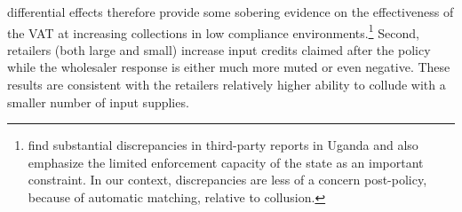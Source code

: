 differential effects therefore provide some sobering evidence on the effectiveness of the VAT at increasing collections in low compliance environments.\footnote{\cite{almunia2017analysis} find substantial discrepancies in third-party reports in Uganda and also emphasize the limited enforcement capacity of the state as an important constraint. In our context, discrepancies are less of a concern post-policy, because of automatic matching, relative to collusion.} Second, retailers (both large and small) increase input credits claimed after the policy while the wholesaler response is either much more muted or even negative. These results are consistent with the retailers relatively higher ability to collude with a smaller number of input supplies.



